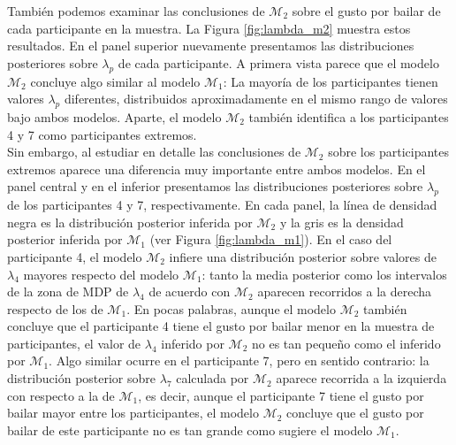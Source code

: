 \documentclass{article}
\begin{document}
\indent También podemos examinar las conclusiones de $\mathcal M_2$ sobre el gusto por bailar de cada participante en la muestra. La Figura \ref{fig:lambda_m2} muestra estos resultados. En el panel superior nuevamente presentamos las distribuciones posteriores sobre $\lambda_p$ de cada participante. A primera vista parece que el modelo $\mathcal M_2$ concluye algo similar al modelo $\mathcal M_1$: La mayoría de los participantes tienen valores $\lambda_p$ diferentes, distribuidos aproximadamente en el mismo rango de valores bajo ambos modelos. Aparte, el modelo $\mathcal M_2$ también identifica a los participantes 4 y 7 como participantes extremos.\\
\indent Sin embargo, al estudiar en detalle las conclusiones de $\mathcal M_2$ sobre los participantes extremos aparece una diferencia muy importante entre ambos modelos. En el panel central y en el inferior presentamos las distribuciones posteriores sobre $\lambda_p$ de los participantes 4 y 7, respectivamente. En cada panel, la línea de densidad negra es la distribución posterior inferida por $\mathcal M_2$ y la gris es la densidad posterior inferida por $\mathcal M_1$ (ver Figura \ref{fig:lambda_m1}). En el caso del participante 4, el modelo $\mathcal M_2$ infiere una distribución posterior sobre valores de $\lambda_4$ mayores respecto del modelo $\mathcal M_1$: tanto la media posterior como los intervalos de la zona de MDP de $\lambda_4$ de acuerdo con $\mathcal M_2$ aparecen recorridos a la derecha respecto de los de $\mathcal M_1$. En pocas palabras, aunque el modelo $\mathcal M_2$ también concluye que  el participante 4 tiene el gusto por bailar menor en la muestra de participantes, el valor de $\lambda_4$ inferido por $\mathcal M_2$ no es tan pequeño como el inferido por $\mathcal M_1$. Algo similar ocurre en el participante 7, pero en sentido contrario: la distribución posterior sobre $\lambda_7$ calculada por $\mathcal M_2$ aparece recorrida a la izquierda con respecto a la de $\mathcal M_1$, es decir, aunque el participante 7 tiene el gusto por bailar mayor entre los participantes, el modelo $\mathcal M_2$ concluye que el gusto por bailar de este participante no es tan grande como sugiere el modelo $\mathcal M_1$.\\
\end{document}
